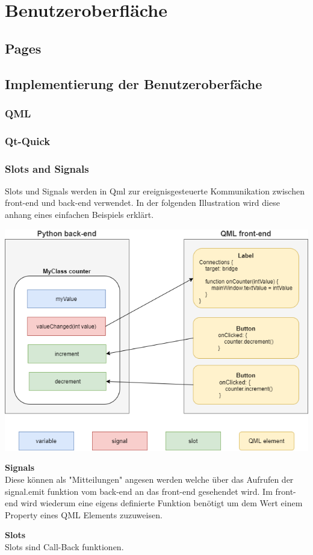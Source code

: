 \section{Benutzeroberfläche}

\subsection{Pages}
\subsection{Implementierung der Benutzeroberfäche}
\subsubsection{QML}
\subsubsection{Qt-Quick}
\subsubsection{Slots and Signals}
Slots und Signals werden in Qml zur ereignisgesteuerte Kommunikation zwischen front-end und back-end verwendet. In der folgenden Illustration wird diese anhang eines einfachen Beispiels erklärt.
\begin{center}
\includegraphics[scale=0.5]{figures/hcis/signals_slots.png}
\end{center}

\textbf{Signals}\\ \medskip
	Diese können als "Mitteilungen" angesen werden welche über das Aufrufen der signal.emit funktion vom back-end an das front-end gesehendet wird. Im front-end wird wiederum eine eigens definierte Funktion benötigt um dem Wert einem Property eines QML Elements zuzuweisen.
	\item \textbf{Slots}\\ \medskip
	Slots sind Call-Back funktionen. 
	
